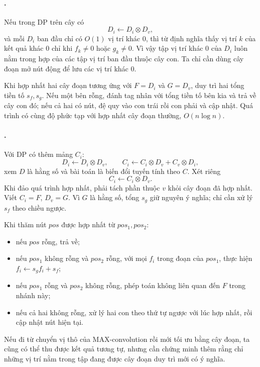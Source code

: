 \documentclass[11pt]{article}
\begin{document}
\paragraph{.}
Nếu trong DP trên cây có
\[
  D_i\leftarrow D_i\otimes D_v,
\]
và mỗi \(D_i\) ban đầu chỉ có \(O(1)\) vị trí khác \(0\), thì từ định nghĩa
thấy vị trí \(k\) của kết quả khác \(0\) chỉ khi \(f_k\ne0\) hoặc \(g_k\ne0\).
Vì vậy tập vị trí khác \(0\) của \(D_i\) luôn nằm trong hợp của các tập vị trí
ban đầu thuộc cây con. Ta chỉ cần dùng cây đoạn mở nút động để lưu các vị trí
khác \(0\).

Khi hợp nhất hai cây đoạn tương ứng với \(F=D_i\) và \(G=D_v\), duy trì hai tổng
tiền tố \(s_f,s_g\). Nếu một bên rỗng, đánh tag nhân với tổng tiền tố bên kia
và trả về cây con đó; nếu cả hai có nút, đệ quy vào con trái rồi con phải và
cập nhật. Quá trình có cùng độ phức tạp với hợp nhất cây đoạn thường,
\(O(n\log n)\).

\paragraph{.}
Với DP có thêm mảng \(C_i\):
\[
  D_i\leftarrow D_i\otimes D_v,\qquad
  C_i\leftarrow C_i\otimes D_v+C_v\otimes D_i,
\]
xem \(D\) là hằng số và bài toán là biến đổi tuyến tính theo \(C\). Xét riêng
\[
  C_i\leftarrow C_i\otimes D_v.
\]
Khi đảo quá trình hợp nhất, phải tách phần thuộc \(v\) khỏi cây đoạn đã hợp
nhất. Viết \(C_i=F\), \(D_v=G\). Vì \(G\) là hằng số, tổng \(s_g\) giữ nguyên
ý nghĩa; chỉ cần xử lý \(s_f\) theo chiều ngược.

Khi thăm nút \(pos\) được hợp nhất từ \(pos_1,pos_2\):
\begin{itemize}
  \item nếu \(pos\) rỗng, trả về;
  \item nếu \(pos_1\) không rỗng và \(pos_2\) rỗng, với mọi \(f_i\) trong đoạn
  của \(pos_1\), thực hiện \(f_i\leftarrow s_g f_i+s_f\);
  \item nếu \(pos_1\) rỗng và \(pos_2\) không rỗng, phép toán không liên quan
  đến \(F\) trong nhánh này;
  \item nếu cả hai không rỗng, xử lý hai con theo thứ tự ngược với lúc hợp
  nhất, rồi cập nhật nút hiện tại.
\end{itemize}
Nếu đi từ chuyển vị thô của MAX-convolution rồi mới tối ưu bằng cây đoạn, ta
cũng có thể thu được kết quả tương tự, nhưng cần chứng minh thêm rằng chỉ những
vị trí nằm trong tập đang được cây đoạn duy trì mới có ý nghĩa.
\end{document}
